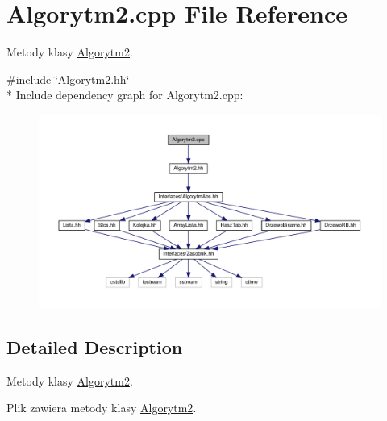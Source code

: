 \hypertarget{a00022}{}\section{Algorytm2.\+cpp File Reference}
\label{a00022}


Metody klasy \hyperlink{a00003}{Algorytm2}.  


{\ttfamily \#include \char`\"{}Algorytm2.\+hh\char`\"{}}\\*
Include dependency graph for Algorytm2.\+cpp\+:
\nopagebreak
\begin{figure}[H]
\begin{center}
\leavevmode
\includegraphics[width=350pt]{a00063}
\end{center}
\end{figure}


\subsection{Detailed Description}
Metody klasy \hyperlink{a00003}{Algorytm2}. 

Plik zawiera metody klasy \hyperlink{a00003}{Algorytm2}. 
